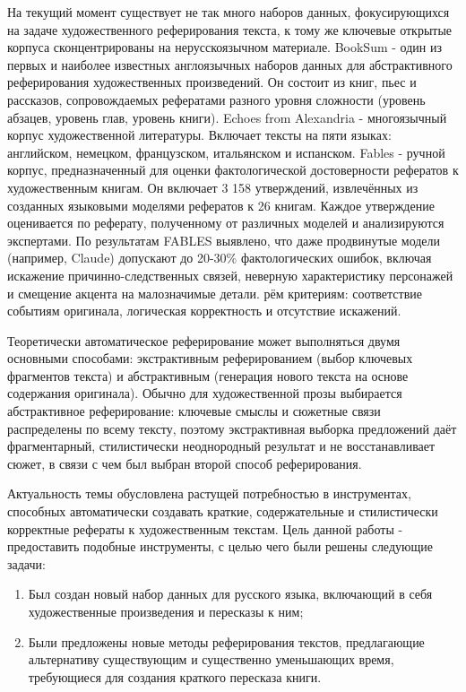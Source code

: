 \documentclass{superfri}
\begin{document}
На текущий момент существует не так много наборов данных, фокусирующихся на задаче художественного реферирования текста, 
к тому же ключевые открытые корпуса сконцентрированы на нерусскоязычном материале. BookSum \cite{BookSum} - один из первых и наиболее известных англоязычных наборов данных
для абстрактивного реферирования художественных произведений. Он состоит из книг, пьес и рассказов, сопровождаемых рефератами разного уровня сложности (уровень абзацев, 
уровень глав, уровень книги). 
Echoes from Alexandria \cite{alexandria} - многоязычный корпус художественной литературы. Включает тексты на пяти языках: английском, немецком, французском, итальянском и испанском.
Fables \cite{fables} - ручной корпус, предназначенный для оценки фактологической достоверности рефератов к художественным книгам. 
Он включает 3 158 утверждений, извлечённых из созданных языковыми моделями рефератов к 26 книгам.
Каждое утверждение оценивается по реферату, полученному от различных моделей и анализируются экспертами. 
По результатам FABLES выявлено, что даже продвинутые модели (например, Claude) допускают до 20-30\% фактологических ошибок, включая искажение
причинно-следственных связей, неверную характеристику персонажей и смещение
акцента на малозначимые детали.
рём критериям: соответствие событиям оригинала, логическая корректность и отсутствие искажений.

Теоретически автоматическое реферирование может выполняться двумя основными способами: экстрактивным реферированием (выбор ключевых фрагментов текста) и абстрактивным (генерация нового текста на основе содержания оригинала). 
Обычно для художественной прозы выбирается абстрактивное реферирование: 
ключевые смыслы и сюжетные связи распределены по всему тексту, поэтому экстрактивная выборка предложений даёт фрагментарный, 
стилистически неоднородный результат и не восстанавливает сюжет, в связи с чем был выбран второй способ реферирования.

Актуальность темы обусловлена растущей потребностью в инструментах, способных
автоматически создавать краткие, содержательные и стилистически корректные рефераты к художественным текстам.
Цель данной работы - предоставить подобные инструменты, с целью чего были решены следующие задачи:
\begin{enumerate}
  \item Был создан новый набор данных для русского языка, включающий в себя художественные произведения и пересказы к ним;
  \item Были предложены новые методы реферирования текстов, предлагающие альтернативу существующим и существенно уменьшающих время, требующиеся для создания краткого пересказа книги.
\end{enumerate}
\end{document}
